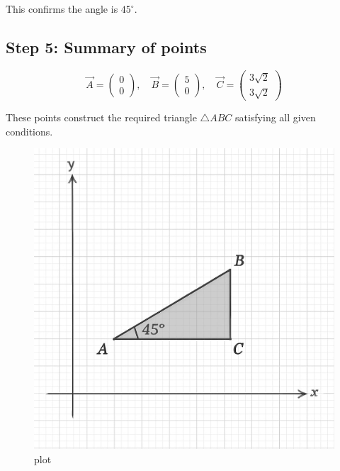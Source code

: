 \documentclass[journal]{IEEEtran}
\begin{document}
This confirms the angle is $45^\circ$.

\subsection*{\textbf{Step} 5: Summary of points}

\[
\boxed{
\vec{A} = \begin{pmatrix}0 \\ 0\end{pmatrix}, \quad
\vec{B} = \begin{pmatrix}5 \\ 0\end{pmatrix}, \quad
\vec{C} = \begin{pmatrix}3\sqrt{2} \\ 3\sqrt{2}\end{pmatrix}
}
\]

These points construct the required triangle $\triangle ABC$ satisfying all given conditions.



\begin{figure}[htbp]
\centering
\includegraphics[width=0.7\columnwidth]{figs/fig1.png} 
\caption{plot}
\label{fig:1}
\end{figure}
\end{document}
